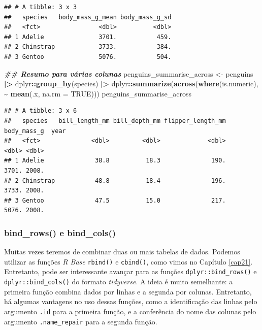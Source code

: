 \documentclass[
]{article}
\newenvironment{Shaded}{\begin{snugshade}}{\end{snugshade}}
\newcommand{\AttributeTok}[1]{\textcolor[rgb]{0.13,0.29,0.53}{#1}}
\newcommand{\ConstantTok}[1]{\textcolor[rgb]{0.56,0.35,0.01}{#1}}
\newcommand{\DocumentationTok}[1]{\textcolor[rgb]{0.56,0.35,0.01}{\textbf{\textit{#1}}}}
\newcommand{\FunctionTok}[1]{\textcolor[rgb]{0.13,0.29,0.53}{\textbf{#1}}}
\newcommand{\NormalTok}[1]{#1}
\newcommand{\OtherTok}[1]{\textcolor[rgb]{0.56,0.35,0.01}{#1}}
\newcommand{\SpecialCharTok}[1]{\textcolor[rgb]{0.81,0.36,0.00}{\textbf{#1}}}
\begin{document}
\begin{verbatim}
## # A tibble: 3 x 3
##   species   body_mass_g_mean body_mass_g_sd
##   <fct>                <dbl>          <dbl>
## 1 Adelie               3701.           459.
## 2 Chinstrap            3733.           384.
## 3 Gentoo               5076.           504.
\end{verbatim}

\begin{Shaded}
\begin{Highlighting}[]
\DocumentationTok{\#\# Resumo para várias colunas}
\NormalTok{penguins\_summarise\_across }\OtherTok{\textless{}{-}}\NormalTok{ penguins }\SpecialCharTok{|\textgreater{}} 
\NormalTok{    dplyr}\SpecialCharTok{::}\FunctionTok{group\_by}\NormalTok{(species) }\SpecialCharTok{|\textgreater{}} 
\NormalTok{    dplyr}\SpecialCharTok{::}\FunctionTok{summarize}\NormalTok{(}\FunctionTok{across}\NormalTok{(}\FunctionTok{where}\NormalTok{(is.numeric), }\SpecialCharTok{\textasciitilde{}} \FunctionTok{mean}\NormalTok{(.x, }\AttributeTok{na.rm =} \ConstantTok{TRUE}\NormalTok{)))}
\NormalTok{penguins\_summarise\_across}
\end{Highlighting}
\end{Shaded}

\begin{verbatim}
## # A tibble: 3 x 6
##   species   bill_length_mm bill_depth_mm flipper_length_mm body_mass_g  year
##   <fct>              <dbl>         <dbl>             <dbl>       <dbl> <dbl>
## 1 Adelie              38.8          18.3              190.       3701. 2008.
## 2 Chinstrap           48.8          18.4              196.       3733. 2008.
## 3 Gentoo              47.5          15.0              217.       5076. 2008.
\end{verbatim}

\hypertarget{bind_rows-e-bind_cols}{%
\subsubsection{bind\_rows() e bind\_cols()}\label{bind_rows-e-bind_cols}}

Muitas vezes teremos de combinar duas ou mais tabelas de dados. Podemos utilizar as funções \emph{R Base} \texttt{rbind()} e \texttt{cbind()}, como vimos no Capítulo \ref{cap21}. Entretanto, pode ser interessante avançar para as funções \texttt{dplyr::bind\_rows()} e \texttt{dplyr::bind\_cols()} do formato \emph{tidyverse}. A ideia é muito semelhante: a primeira função combina dados por linhas e a segunda por colunas. Entretanto, há algumas vantagens no uso dessas funções, como a identificação das linhas pelo argumento \texttt{.id} para a primeira função, e a conferência do nome das colunas pelo argumento \texttt{.name\_repair} para a segunda função.
\end{document}
